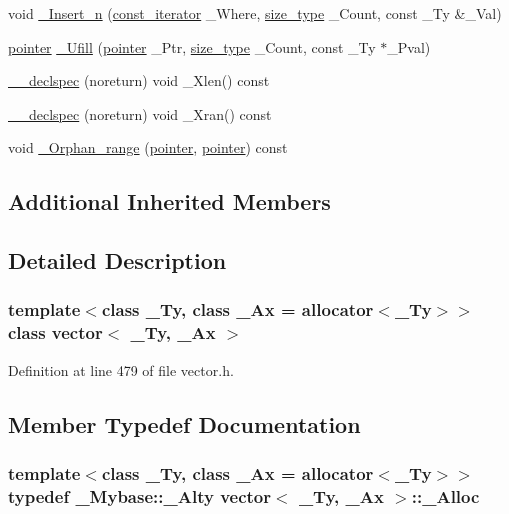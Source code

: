 \begin{DoxyCompactItemize}
\item 
void \hyperlink{classvector_af4c55e88f9f4c6cc90163700228505cb}{\+\_\+\+Insert\+\_\+n} (\hyperlink{classvector_abed2910558c61a5a17113b2d250994da}{const\+\_\+iterator} \+\_\+\+Where, \hyperlink{classvector_ac975e84f5d6c2fe2267bb354a85818af}{size\+\_\+type} \+\_\+\+Count, const \+\_\+\+Ty \&\+\_\+\+Val)
\item 
\hyperlink{classvector_a7f69707c8f1cc638260b523d48793523}{pointer} \hyperlink{classvector_af7344c421c511345d29874b97cf021f8}{\+\_\+\+Ufill} (\hyperlink{classvector_a7f69707c8f1cc638260b523d48793523}{pointer} \+\_\+\+Ptr, \hyperlink{classvector_ac975e84f5d6c2fe2267bb354a85818af}{size\+\_\+type} \+\_\+\+Count, const \+\_\+\+Ty $\ast$\+\_\+\+Pval)
\item 
\hyperlink{classvector_a804dd7945b52d9e372b1433c16ab78c2}{\+\_\+\+\_\+declspec} (noreturn) void \+\_\+\+Xlen() const 
\item 
\hyperlink{classvector_ae43c8191913ff101482185dc22e80d15}{\+\_\+\+\_\+declspec} (noreturn) void \+\_\+\+Xran() const 
\item 
void \hyperlink{classvector_abc1081a6cc86d9b7dae1cf7b8aeaca68}{\+\_\+\+Orphan\+\_\+range} (\hyperlink{classvector_a7f69707c8f1cc638260b523d48793523}{pointer}, \hyperlink{classvector_a7f69707c8f1cc638260b523d48793523}{pointer}) const 
\end{DoxyCompactItemize}
\subsection*{Additional Inherited Members}


\subsection{Detailed Description}
\subsubsection*{template$<$class \+\_\+\+Ty, class \+\_\+\+Ax = allocator$<$\+\_\+\+Ty$>$$>$class vector$<$ \+\_\+\+Ty, \+\_\+\+Ax $>$}



Definition at line 479 of file vector.\+h.



\subsection{Member Typedef Documentation}
\hypertarget{classvector_af95a9863612fdd67572c39c825c5aee6}{
\subsubsection[{\+\_\+\+Alloc}]{\setlength{\rightskip}{0pt plus 5cm}template$<$class \+\_\+\+Ty, class \+\_\+\+Ax = allocator$<$\+\_\+\+Ty$>$$>$ typedef {\bf \+\_\+\+Mybase\+::\+\_\+\+Alty} {\bf vector}$<$ \+\_\+\+Ty, \+\_\+\+Ax $>$\+::{\bf \+\_\+\+Alloc}}}\label{classvector_af95a9863612fdd67572c39c825c5aee6}


